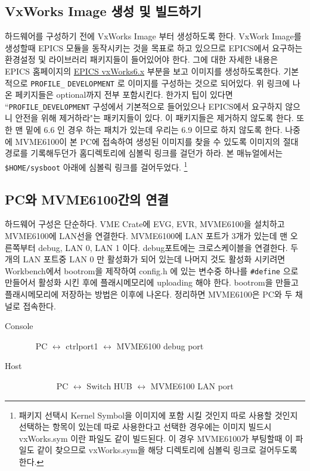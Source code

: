 \documentclass[11pt,a4paper]{article}
\begin{document}
\subsection{VxWorks Image 생성 및 빌드하기}
하드웨어를 구성하기 전에 VxWorks Image 부터 생성하도록 한다. VxWork Image를 생성할때 EPICS 모듈을 동작시키는 것을 
목표로 하고 있으므로 EPICS에서 요구하는 환경설정 및 라이브러리 패키지들이 들어있어야 한다. 그에 대한 자세한 내용은
EPICS 홈페이지의 \href{http://www.aps.anl.gov/epics/base/vxWorks6.php}{EPICS vxWorks6.x} 부분을 보고 이미지를 생성하도록한다.
기본적으로 \verb|PROFILE_| \verb|DEVELOPMENT| 로 이미지를 구성하는 것으로 되어있다. 위 링크에 나온 페키지들은 optional까지 전부 포함시킨다. 
한가지 팁이 있다면 ``\verb|PROFILE_DEVELOPMENT| 구성에서 기본적으로 들어있으나 EPICS에서 요구하지 않으니 안전을 위해 제거하라"는 패키지들이 있다. 이 패키지들은 제거하지 않도록 한다. 또한 맨 밑에 6.6 인 경우 하는 패치가 있는데 우리는 6.9 이므로 하지 않도록 한다.
나중에 MVME6100이 본 PC에 접속하여 생성된 이미지를 찾을 수 있도록 이미지의 절대 경로를 기록해두던가 홈디렉토리에 심볼릭 링크를 걸던가 하라. 본 매뉴얼에서는 \verb|$HOME/sysboot| 아래에 심볼릭 링크를 걸어두었다. \footnote{패키지 선택시 Kernel Symbol을 이미지에 포함 시킬 것인지 따로 사용할 것인지 선택하는 항목이 있는데 따로 사용한다고 선택한 경우에는 이미지 빌드시 vxWorks.sym 이란 파일도 같이 빌드된다. 이 경우 MVME6100가 부팅할때 이 파일도 같이 찾으므로 vxWorks.sym을 해당 디렉토리에 심볼릭 링크로 걸어두도록 한다.}

\subsection{PC와 MVME6100간의 연결}
하드웨어 구성은 단순하다. VME Crate에 EVG, EVR, MVME6100을 설치하고 MVME6100에 LAN선을 연결한다.
MVME6100에 LAN 포트가 3개가 있는데 맨 오른쪽부터 debug, LAN 0, LAN 1 이다. debug포트에는 크로스케이블을 연결한다.
두개의 LAN 포트중 LAN 0 만 활성화가 되어 있는데 나머지 것도 활성화 시키려면 Workbench에서 bootrom을 제작하여
config.h 에 있는 변수중 하나를 \verb|#define| 으로 만들어서 활성화 시킨 후에 플래시메모리에 uploading 해야 한다.
bootrom을 만들고 플래시메모리에 저장하는 방법은 이후에 나온다.
정리하면 MVME6100은 PC와 두 채널로 접속한다.

\begin{framed}
\begin{description}
\item[Console] ~ PC $\leftrightarrow$ ctrlport1 $\leftrightarrow$ MVME6100 debug port 
\item[Host]   ~~~~~~ PC $\leftrightarrow$ Switch HUB $\leftrightarrow$ MVME6100 LAN port
\end{description}
\end{framed}
\end{document}
